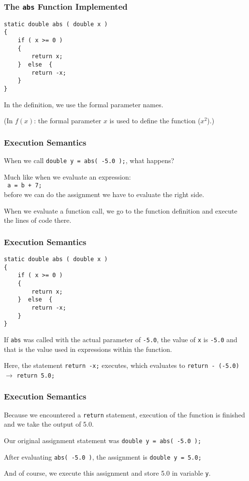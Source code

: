 \begin{frame}[fragile]
\frametitle{The \texttt{abs} Function Implemented}

\begin{verbatim}
static double abs ( double x ) 
{
    if ( x >= 0 ) 
    {
        return x;
    }  else  {
        return -x;
    }
}
\end{verbatim}

In the definition, we use the formal parameter names. 

(In $f(x)$: the formal parameter $x$ is used to define the function ($x^{2}$).)

\end{frame}

\begin{frame}[fragile]
\frametitle{Execution Semantics}
When we call \texttt{double y = abs( -5.0 );}, what happens?

Much like when we evaluate an expression:\\
\quad \texttt{ a = b + 7;}\\
before we can do the assignment we have to evaluate the right side.

When we evaluate a function call, we go to the function definition and execute the lines of code there.

\end{frame}

\begin{frame}[fragile]
\frametitle{Execution Semantics}

\begin{verbatim}
static double abs ( double x ) 
{
    if ( x >= 0 ) 
    {
        return x;
    }  else  {
        return -x;
    }
}
\end{verbatim}

If \texttt{abs} was called with the actual parameter of \texttt{-5.0}, the value of \texttt{x} is \texttt{-5.0} and that is the value used in expressions within the function.

Here, the statement \texttt{return -x;} executes, which evaluates to \texttt{return - (-5.0)} $\rightarrow$ \texttt{return 5.0;}

\end{frame}

\begin{frame}
\frametitle{Execution Semantics}

Because we encountered a \texttt{return} statement, execution of the function is finished and we take the output of 5.0.

Our original assignment statement was \texttt{double y = abs( -5.0 );}

After evaluating \texttt{abs( -5.0 )}, the assignment is \texttt{double y = 5.0;}

And of course, we execute this assignment and store 5.0 in variable \texttt{y}.

\end{frame}

